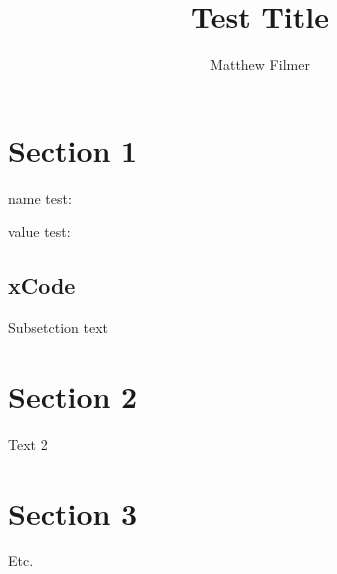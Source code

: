 \documentclass{infosheet}
\title{Test Title}
\author{Matthew Filmer}
\begin{document}
\maketitle

\section{Section 1}

name test: 

value test: 

\lipsum[1]
\subsection{xCode}
Subsetction text

\section{Section 2}
Text 2
\lipsum

\section{Section 3}
Etc.
\end{document}
